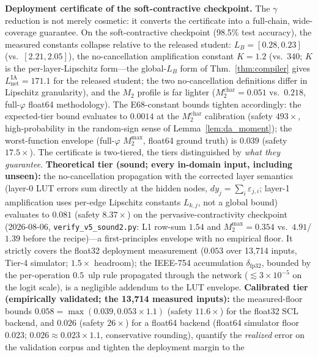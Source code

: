 \vspace{4pt}
\noindent\textbf{Deployment certificate of the soft-contractive checkpoint.}
The $\gamma$ reduction is not merely cosmetic: it converts the certificate
into a full-chain, wide-coverage guarantee. On the soft-contractive
checkpoint (98.5\% test accuracy), the measured constants collapse
relative to the released student: $L_B = [0.28, 0.23]$ (vs.\ $[2.21,
2.05]$), the no-cancellation amplification constant $K = 1.2$
(vs.\ $340$; $K$ is the per-layer-Lipschitz form---the global-$L_B$ form
of Thm.~\ref{thm:compiler} gives $L_{\text{net}}^{\text{IA}} = 171.1$
for the released student; the two no-cancellation definitions differ in
Lipschitz granularity), and the $M_2$ profile is far lighter
($M_2^{\text{char}} = 0.051$ vs.\ $0.218$, full-$\varphi$ float64
methodology). The
E68-constant bounds tighten accordingly: the expected-tier bound
evaluates to $0.0014$ at the $M_2^{\text{char}}$ calibration (safety
$493\times$, high-probability in the random-sign sense of
Lemma~\ref{lem:da_moment}); the worst-function envelope (full-$\varphi$
$M_2^{\max}$, float64 ground truth) is $0.039$ (safety $17.5\times$).
The certificate is two-tiered, the tiers distinguished by \emph{what
they guarantee}. \textbf{Theoretical tier (sound; every in-domain input,
including unseen):} the no-cancellation propagation with the corrected
layer semantics (layer-0 LUT errors sum directly at the hidden nodes,
$dy_j = \sum_i \varepsilon_{j,i}$; layer-1 amplification uses per-edge
Lipschitz constants $L_{k,j}$, not a global bound) evaluates to $0.081$
(safety $8.37\times$) on the pervasive-contractivity checkpoint
(2026-08-06, \texttt{verify\_v5\_sound2.py}: L1 row-sum $1.54$ and
$M_2^{\max} = 0.354$ vs.\ $4.91$/$1.39$ before the recipe)---a
first-principles envelope with no empirical
floor. It strictly covers the float32 deployment measurement ($0.053$
over 13{,}714 inputs, Tier-4 simulator; $1.5\times$ headroom); the
IEEE-754 accumulation $\delta_{\text{fp32}}$, bounded by the
per-operation $0.5$~ulp rule propagated through the network
($\lesssim 3\times10^{-5}$ on the logit scale), is a negligible addendum
to the LUT envelope.
\textbf{Calibrated tier (empirically validated; the 13{,}714 measured
inputs):} the measured-floor bounds $0.058 = \max(0.039, 0.053 \times
1.1)$ (safety $11.6\times$) for the float32 SCL backend, and $0.026$
(safety $26\times$) for a float64 backend (float64 simulator floor
$0.023$; $0.026 \approx 0.023 \times 1.1$, conservative rounding),
quantify the \emph{realized} error
on the validation corpus and tighten the deployment margin to the
